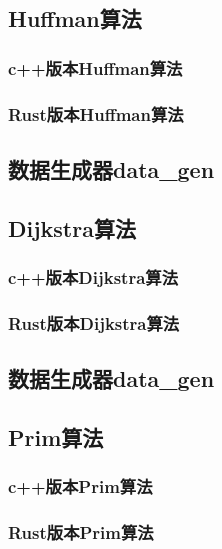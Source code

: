 \subsection{Huffman算法}
\subsubsection{c++版本Huffman算法}

\subsubsection{Rust版本Huffman算法}

\subsection{数据生成器data\_gen}


\subsection{Dijkstra算法}
\subsubsection{c++版本Dijkstra算法}

\subsubsection{Rust版本Dijkstra算法}

\subsection{数据生成器data\_gen}


\subsection{Prim算法}
\subsubsection{c++版本Prim算法}

\subsubsection{Rust版本Prim算法}

